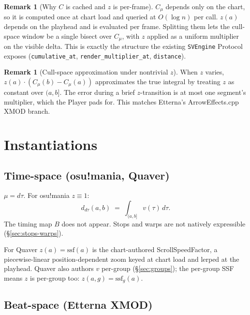 \documentclass[11pt]{article}
\theoremstyle{definition}
\newtheorem{remark}[theorem]{Remark}
\newcommand{\dtau}{\,d\tau}
\begin{document}
\begin{remark}[Why $C$ is cached and $z$ is per-frame]
\label{rem:why-split}
$C_\mu$ depends only on the chart, so it is computed once at chart load and
queried at $O(\log n)$ per call. $z(a)$ depends on the playhead and is
evaluated per frame. Splitting them lets the cull-space window be a single
bisect over $C_\mu$, with $z$ applied as a uniform multiplier on the visible
delta. This is exactly the structure the existing \texttt{SVEngine} Protocol
exposes (\texttt{cumulative\_at}, \texttt{render\_multiplier\_at},
\texttt{distance}).
\end{remark}

\begin{remark}[Cull-space approximation under nontrivial $z$]
When $z$ varies, $z(a) \cdot (C_\mu(b) - C_\mu(a))$ approximates the true
integral by treating $z$ as constant over $(a, b]$. The error during a brief
$z$-transition is at most one segment's multiplier, which the Player pads for.
This matches Etterna's ArrowEffects.cpp XMOD branch.
\end{remark}

\section{Instantiations}
\label{sec:instances}

\subsection{Time-space (osu!mania, Quaver)}

$\mu = d\tau$. For osu!mania $z \equiv 1$:
\[
d_{d\tau}(a, b) \;=\; \int_{(a,b]} v(\tau)\dtau.
\]
The timing map $B$ does not appear. Stops and warps are not natively
expressible (\S\ref{sec:stops-warps}).

For Quaver $z(a) = \mathrm{ssf}(a)$ is the chart-authored
ScrollSpeedFactor, a piecewise-linear position-dependent zoom keyed at
chart load and lerped at the playhead. Quaver also authors $v$
per-group (\S\ref{sec:groups}); the per-group SSF means $z$ is per-group
too: $z(a, g) = \mathrm{ssf}_g(a)$.

\subsection{Beat-space (Etterna XMOD)}
\label{sec:beat-instance}
\end{document}
